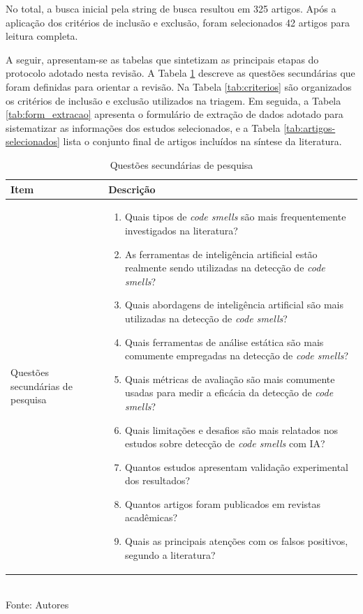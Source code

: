 No total, a busca inicial pela string de busca resultou em 325 artigos. Após a aplicação dos critérios de inclusão e exclusão,
foram selecionados 42 artigos para leitura completa.

A seguir, apresentam-se as tabelas que sintetizam as principais etapas do protocolo adotado nesta revisão. 
A Tabela \ref{tab:questoes_secundarias} descreve as questões secundárias que foram definidas para orientar a revisão. 
Na Tabela \ref{tab:criterios} são organizados os critérios de inclusão e exclusão utilizados na triagem.
Em seguida, a Tabela \ref{tab:form_extracao} apresenta o formulário de extração de dados adotado para sistematizar 
as informações dos estudos selecionados, e a Tabela \ref{tab:artigos-selecionados}  lista o conjunto final de artigos 
incluídos na síntese da literatura.

\begin{table}[h]
    \centering
    \caption{Questões secundárias de pesquisa}
    \label{tab:questoes_secundarias}
    \begin{tabular}{|p{4cm}|p{9cm}|}
        \hline
        \textbf{Item} & \textbf{Descrição} \\
        \hline
        Questões secundárias de pesquisa &
        \begin{enumerate}[leftmargin=*, label=\arabic*.]
            \item Quais tipos de \textit{code smells} são mais frequentemente investigados na literatura?
            \item As ferramentas de inteligência artificial estão realmente sendo utilizadas na detecção de \textit{code smells}?
            \item Quais abordagens de inteligência artificial são mais utilizadas na detecção de \textit{code smells}?
            \item Quais ferramentas de análise estática são mais comumente empregadas na detecção de \textit{code smells}?
            \item Quais métricas de avaliação são mais comumente usadas para medir a eficácia da detecção de \textit{code smells}?
            \item Quais limitações e desafios são mais relatados nos estudos sobre detecção de \textit{code smells} com IA?
            \item Quantos estudos apresentam validação experimental dos resultados?
            \item Quantos artigos foram publicados em revistas acadêmicas?
            \item Quais as principais atenções com os falsos positivos, segundo a literatura?
        \end{enumerate} \\
        \hline
    \end{tabular}\\[0.4em]
    Fonte: Autores
\end{table}


